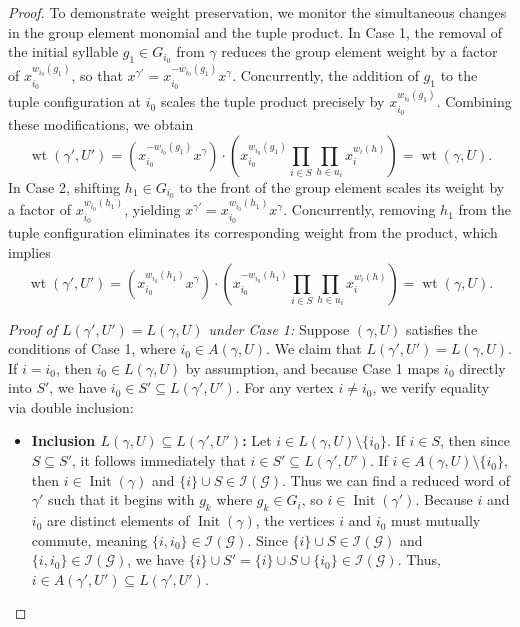 \documentclass[11pt,reqno]{amsart}
\numberwithin{equation}{section} %
\theoremstyle{definition}
\theoremstyle{remark}
\numberwithin{equation}{section}
\begin{document}
\begin{proof}
To demonstrate weight preservation, we monitor the simultaneous changes in the group element monomial and the tuple product. In Case 1, the removal of the initial syllable $g_1 \in G_{i_0}$ from $\gamma$ reduces the group element weight by a factor of $x_{i_0}^{w_{i_0}(g_1)}$, so that $x^{\gamma'} = x_{i_0}^{-w_{i_0}(g_1)} x^\gamma$. Concurrently, the addition of $g_1$ to the tuple configuration at $i_0$ scales the tuple product precisely by $x_{i_0}^{w_{i_0}(g_1)}$. Combining these modifications, we obtain
\begin{equation*}
\operatorname{wt}(\gamma',U') = \left(x_{i_0}^{-w_{i_0}(g_1)} x^\gamma\right) \cdot \left( x_{i_0}^{w_{i_0}(g_1)} \prod_{i \in S} \prod_{h \in u_i} x_i^{w_i(h)} \right) = \operatorname{wt}(\gamma,U).
\end{equation*}
In Case 2, shifting $h_1 \in G_{i_0}$ to the front of the group element scales its weight by a factor of $x_{i_0}^{w_{i_0}(h_1)}$, yielding $x^{\gamma'} = x_{i_0}^{w_{i_0}(h_1)} x^\gamma$. Concurrently, removing $h_1$ from the tuple configuration eliminates its corresponding weight from the product, which implies
\begin{equation*}
\operatorname{wt}(\gamma',U') = \left(x_{i_0}^{w_{i_0}(h_1)} x^\gamma\right) \cdot \left( x_{i_0}^{-w_{i_0}(h_1)} \prod_{i \in S} \prod_{h \in u_i} x_i^{w_i(h)} \right) = \operatorname{wt}(\gamma,U).
\end{equation*}

\smallskip
\noindent\textit{  Proof of $L(\gamma', U') = L(\gamma, U)$ under Case 1:}
Suppose $(\gamma, U)$ satisfies the conditions of Case 1, where $i_0 \in A(\gamma, U)$. We claim that $L(\gamma', U') = L(\gamma, U)$. If $i = i_0$, then $i_0 \in L(\gamma, U)$ by assumption, and because Case 1 maps $i_0$ directly into $S'$, we have $i_0 \in S' \subseteq L(\gamma', U')$. For any vertex $i \neq i_0$, we verify equality via double inclusion:
\begin{itemize}
    \item \textbf{Inclusion $L(\gamma, U) \subseteq L(\gamma', U')$:} Let $i \in L(\gamma, U) \setminus \{i_0\}$. If $i \in S$, then since $S \subseteq S'$, it follows immediately that $i \in S' \subseteq L(\gamma', U')$. If $i \in A(\gamma, U) \setminus \{i_0\}$, then $i \in \operatorname{Init}(\gamma)$ and $\{i\} \cup S \in \mathcal{I}(\mathcal{G})$. Thus we can find a reduced word of $\gamma'$ such that it begins with $g_k$ where $g_k\in G_i$, so $i \in \operatorname{Init}(\gamma')$. Because $i$ and $i_0$ are distinct elements of $\operatorname{Init}(\gamma)$, the vertices $i$ and $i_0$ must mutually commute, meaning $\{i, i_0\} \in \mathcal{I}(\mathcal{G})$.  Since $\{i\} \cup S \in \mathcal{I}(\mathcal{G})$ and $\{i, i_0\} \in \mathcal{I}(\mathcal{G})$, we have $\{i\} \cup S' = \{i\} \cup S \cup \{i_0\} \in \mathcal{I}(\mathcal{G})$. Thus, $i \in A(\gamma', U') \subseteq L(\gamma', U')$.


\end{itemize}
\end{proof}
\end{document}
